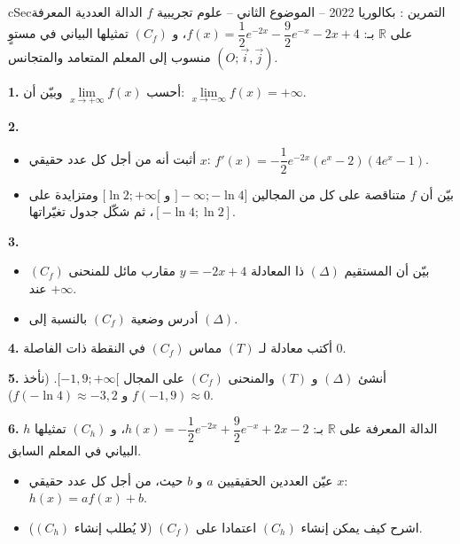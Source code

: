 \documentclass[12pt,a4paper]{article}
\newenvironment{BOX}[2]{\begin{otherlanguage}{english}\begin{arbox}{#1}{#2}}{\end{arbox}\end{otherlanguage}}
\newcounter{exo}
\newenvironment{tamrin}[1]{\stepcounter{exo}\begin{BOX}{cSec}{التمرين \theexo: #1}}{\end{BOX}}
\newcommand{\R}{\mathbb{R}}
\newenvironment{sq}{\begin{itemize}[leftmargin=2.4em,itemsep=3pt]}{\end{itemize}}
\newcommand{\qa}{\item[(أ)]}\newcommand{\qb}{\item[(ب)]}\newcommand{\qc}{\item[(جـ)]}\newcommand{\qd}{\item[(د)]}\newcommand{\qe}{\item[(هـ)]}
\newcommand{\QQ}[1]{\par\smallskip\textbf{#1.} }
\begin{document}
\begin{tamrin}{بكالوريا 2022 -- الموضوع الثاني -- علوم تجريبية}
$f$ الدالة العددية المعرفة على $\R$ بـ: $f(x)=\dfrac12e^{-2x}-\dfrac92e^{-x}-2x+4$، و $(C_f)$ تمثيلها البياني في مستوٍ منسوب إلى المعلم المتعامد والمتجانس $(O;\vec i,\vec j)$.
\QQ{1} أحسب $\lim\limits_{x\to+\infty}f(x)$ وبيّن أن: $\lim\limits_{x\to-\infty}f(x)=+\infty$.
\QQ{2}
\begin{sq}
\qa أثبت أنه من أجل كل عدد حقيقي $x$: $f'(x)=-\dfrac12e^{-2x}\left(e^{x}-2\right)\left(4e^{x}-1\right)$.
\qb بيّن أن $f$ متناقصة على كل من المجالين $]{-}\infty;-\ln4]$ و $[\ln2;+\infty[$ ومتزايدة على $[-\ln4;\ln2]$، ثم شكّل جدول تغيّراتها.
\end{sq}
\QQ{3}
\begin{sq}
\qa بيّن أن المستقيم $(\Delta)$ ذا المعادلة $y=-2x+4$ مقارب مائل للمنحنى $(C_f)$ عند $+\infty$.
\qb أدرس وضعية $(C_f)$ بالنسبة إلى $(\Delta)$.
\end{sq}
\QQ{4} أكتب معادلة لـ $(T)$ مماس $(C_f)$ في النقطة ذات الفاصلة $0$.
\QQ{5} أنشئ $(\Delta)$ و $(T)$ والمنحنى $(C_f)$ على المجال $[-1{,}9;+\infty[$. (نأخذ $f(-1{,}9)\approx0$ و $f(-\ln4)\approx-3{,}2$).
\QQ{6} $h$ الدالة المعرفة على $\R$ بـ: $h(x)=-\dfrac12e^{-2x}+\dfrac92e^{-x}+2x-2$، و $(C_h)$ تمثيلها البياني في المعلم السابق.
\begin{sq}
\qa عيّن العددين الحقيقيين $a$ و $b$ حيث، من أجل كل عدد حقيقي $x$: $h(x)=af(x)+b$.
\qb اشرح كيف يمكن إنشاء $(C_h)$ اعتمادا على $(C_f)$ (لا يُطلب إنشاء $(C_h)$).
\end{sq}
\end{tamrin}
\end{document}
